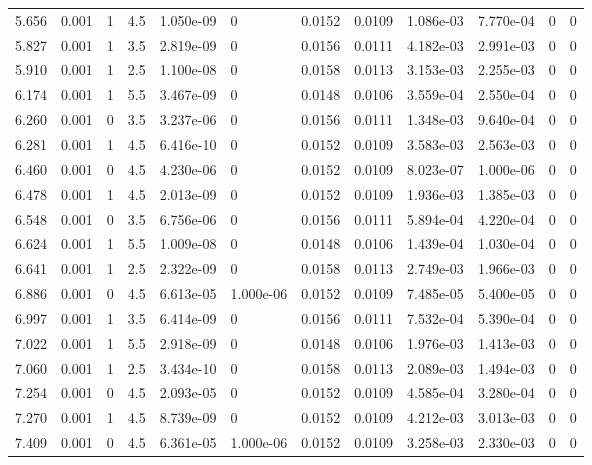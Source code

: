 \documentclass[preview]{standalone}
\begin{document}
{{{\begin{tabular}{L{1.2cm}C{1.2cm} C{0.3cm}C{0.5cm} C{1.4cm}C{1.4cm} C{1.4cm}C{1.4cm} C{1.6cm}C{1.6cm} C{1.6cm}C{1.6cm}}
  5.656  &  0.001  & 1     & 4.5 &  1.050e-09  & 0  &  0.0152&   0.0109& 1.086e-03 & 7.770e-04   &  0 & 0  \\ 
  5.827  &  0.001  & 1     & 3.5 &  2.819e-09  & 0  &  0.0156&   0.0111& 4.182e-03 & 2.991e-03   &  0 & 0  \\ 
  5.910  &  0.001  & 1     & 2.5 &  1.100e-08  & 0  &  0.0158&   0.0113& 3.153e-03 & 2.255e-03   &  0 & 0  \\ 
  6.174  &  0.001  & 1     & 5.5 &  3.467e-09  & 0  &  0.0148&   0.0106& 3.559e-04 & 2.550e-04   &  0 & 0  \\ 
  6.260  &  0.001  & 0     & 3.5 &  3.237e-06  & 0  &  0.0156&   0.0111& 1.348e-03 & 9.640e-04   &  0 & 0  \\ 
  6.281  &  0.001  & 1     & 4.5 &  6.416e-10  & 0  &  0.0152&   0.0109& 3.583e-03 & 2.563e-03   &  0 & 0  \\ 
  6.460  &  0.001  & 0     & 4.5 &  4.230e-06  & 0  &  0.0152&   0.0109& 8.023e-07 & 1.000e-06   &  0 & 0  \\ 
  6.478  &  0.001  & 1     & 4.5 &  2.013e-09  & 0  &  0.0152&   0.0109& 1.936e-03 & 1.385e-03   &  0 & 0  \\ 
  6.548  &  0.001  & 0     & 3.5 &  6.756e-06  & 0  &  0.0156&   0.0111& 5.894e-04 & 4.220e-04   &  0 & 0  \\ 
  6.624  &  0.001  & 1     & 5.5 &  1.009e-08  & 0  &  0.0148&   0.0106& 1.439e-04 & 1.030e-04   &  0 & 0  \\ 
  6.641  &  0.001  & 1     & 2.5 &  2.322e-09  & 0  &  0.0158&   0.0113& 2.749e-03 & 1.966e-03   &  0 & 0  \\ 
  6.886  &  0.001  & 0     & 4.5 &  6.613e-05  & 1.000e-06  &  0.0152&   0.0109& 7.485e-05 & 5.400e-05   &  0 & 0  \\ 
  6.997  &  0.001  & 1     & 3.5 &  6.414e-09  & 0  &  0.0156&   0.0111& 7.532e-04 & 5.390e-04   &  0 & 0  \\ 
  7.022  &  0.001  & 1     & 5.5 &  2.918e-09  & 0  &  0.0148&   0.0106& 1.976e-03 & 1.413e-03   &  0 & 0  \\ 
  7.060  &  0.001  & 1     & 2.5 &  3.434e-10  & 0  &  0.0158&   0.0113& 2.089e-03 & 1.494e-03   &  0 & 0  \\ 
  7.254  &  0.001  & 0     & 4.5 &  2.093e-05  & 0  &  0.0152&   0.0109& 4.585e-04 & 3.280e-04   &  0 & 0  \\ 
  7.270  &  0.001  & 1     & 4.5 &  8.739e-09  & 0  &  0.0152&   0.0109& 4.212e-03 & 3.013e-03   &  0 & 0  \\ 
  7.409  &  0.001  & 0     & 4.5 &  6.361e-05  & 1.000e-06  &  0.0152&   0.0109& 3.258e-03 & 2.330e-03   &  0 & 0  \\ 

\end{tabular}}}}
\end{document}
